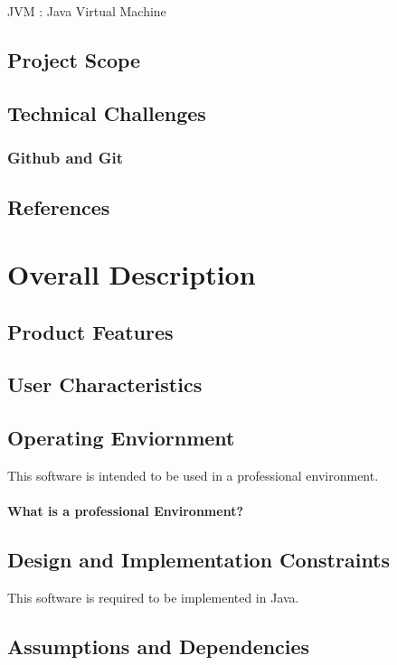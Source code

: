 \documentclass[12pt, draft]{article}
\begin{document}
JVM : Java Virtual Machine 

\subsection{Project Scope}

\subsection{Technical Challenges}
\subsubsection{Github and Git}

\subsection{References}

\section{Overall Description}
\subsection{Product Features}


\subsection{User Characteristics}

\subsection{Operating Enviornment}
This software is intended to be used in a professional environment.
\paragraph[draft=true]{What is a professional Environment?}
\subsection{Design and Implementation Constraints}

This software is required to be implemented in Java. 
\subsection{Assumptions and Dependencies}
\end{document}
